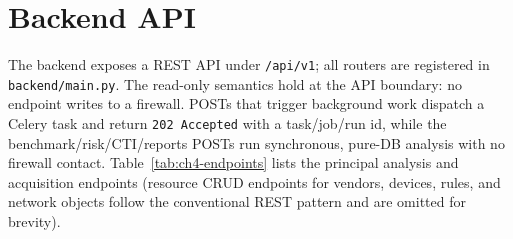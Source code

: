 \documentclass[12pt,a4paper]{report}
\renewcommand{\_}{\textunderscore\allowbreak}
\begin{document}
\section{Backend API}
\label{sec:ch4-api}

The backend exposes a REST API under \texttt{/api/v1}; all routers are registered in \texttt{backend/main.py}. The read-only semantics hold at the API boundary: no endpoint writes to a firewall. POSTs that trigger background work dispatch a Celery task and return \texttt{202 Accepted} with a task/job/run id, while the benchmark/risk/CTI/reports POSTs run synchronous, pure-DB analysis with no firewall contact. Table~\ref{tab:ch4-endpoints} lists the principal analysis and acquisition endpoints (resource CRUD endpoints for vendors, devices, rules, and network objects follow the conventional REST pattern and are omitted for brevity).
\end{document}
